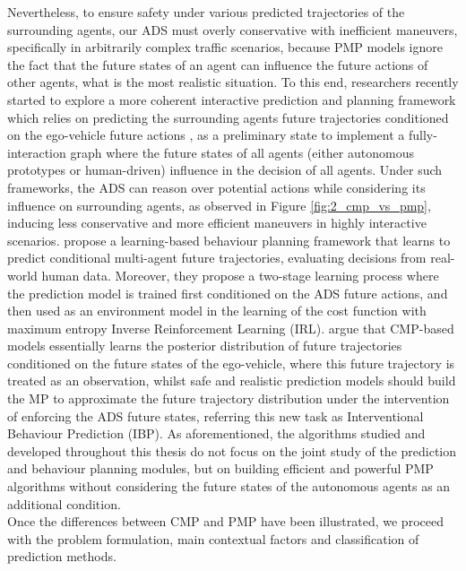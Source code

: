Nevertheless, to ensure safety under various predicted trajectories of the surrounding agents, our \ac{ADS} must overly conservative with inefficient maneuvers, specifically in arbitrarily complex traffic scenarios, because \ac{PMP} models ignore the fact that the future states of an agent can influence the future actions of other agents, what is the most realistic situation. To this end, researchers recently started to explore a more coherent interactive prediction and planning framework which relies on predicting the surrounding agents future trajectories conditioned on the ego-vehicle future actions \cite{tang2019multiple} \cite{rhinehart2019precog} \cite{khandelwal2020if}, as a preliminary state to implement a fully-interaction graph where the future states of all agents (either autonomous prototypes or human-driven) influence in the decision of all agents. Under such frameworks, the \acs{ADS} can reason over potential actions while considering its influence on surrounding agents, as observed in Figure \ref{fig:2_cmp_vs_pmp}, inducing less conservative and more efficient maneuvers in highly interactive scenarios. \cite{huang2023conditional} propose a learning-based behaviour planning framework that learns to predict conditional multi-agent future trajectories, evaluating decisions from real-world human data. Moreover, they propose a two-stage learning process where the prediction model is trained first conditioned on the \ac{ADS} future actions, and then used as an environment model in the learning of the cost function with maximum entropy Inverse Reinforcement Learning (IRL). \cite{tang2022interventional} argue that CMP-based models essentially learns the posterior distribution of future trajectories conditioned on the future states of the ego-vehicle, where this future trajectory is treated as an observation, whilst safe and realistic prediction models should build the \ac{MP} to approximate the future trajectory distribution under the intervention of enforcing the \ac{ADS} future states, referring this new task as Interventional Behaviour Prediction (IBP). As aforementioned, the algorithms studied and developed throughout this thesis do not focus on the joint study of the prediction and behaviour planning modules, but on building efficient and powerful \ac{PMP} algorithms without considering the future states of the autonomous agents as an additional condition. \\

Once the differences between \ac{CMP} and \ac{PMP} have been illustrated, we proceed with the problem formulation, main contextual factors and classification of prediction methods.

